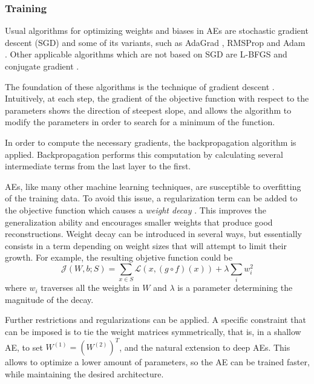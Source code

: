 \subsubsection{Training}\label{Sec.Training}

Usual algorithms for optimizing weights and biases in AEs are stochastic gradient descent (SGD) \cite{robbins1951stochastic} and some of its variants, such as AdaGrad \cite{duchi2011adaptive}, RMSProp \cite{tieleman2012lecture} and Adam \cite{kingma2015adam}. Other applicable algorithms which are not based on SGD are L-BFGS and conjugate gradient \cite{ngiam2011optimization}.

The foundation of these algorithms is the technique of gradient descent \cite{cauchy1847methode}. Intuitively, at each step, the gradient of the objective function with respect to the parameters shows the direction of steepest slope, and allows the algorithm to modify the parameters in order to search for a minimum of the function. 

In order to compute the necessary gradients, the backpropagation algorithm \cite{Backpropagation} is applied. Backpropagation performs this computation by calculating several intermediate terms from the last layer to the first.

AEs, like many other machine learning techniques, are susceptible to overfitting of the training data. To avoid this issue, a regularization term can be added to the objective function which causes a \textit{weight decay} \cite{krogh1992wd}. This improves the generalization ability and encourages smaller weights that produce good reconstructions. Weight decay can be introduced in several ways, but essentially consists in a term depending on weight sizes that will attempt to limit their growth. For example, the resulting objetive function could be
\begin{equation}
  \label{Eq.wd}
  \mathcal J(W,b;S)=\sum_{x\in S}\mathcal L(x, (g\circ f)(x)) + \lambda \sum_{i}w_i^2
\end{equation}
where $w_i$ traverses all the weights in $W$ and $\lambda$ is a parameter determining the magnitude of the decay.

Further restrictions and regularizations can be applied. A specific constraint that can be imposed is to tie the weight matrices symmetrically, that is, in a shallow AE, to set $W^{(1)}=(W^{(2)})^T$, and the natural extension to deep AEs. This allows to optimize a lower amount of parameters, so the AE can be trained faster, while maintaining the desired architecture.

